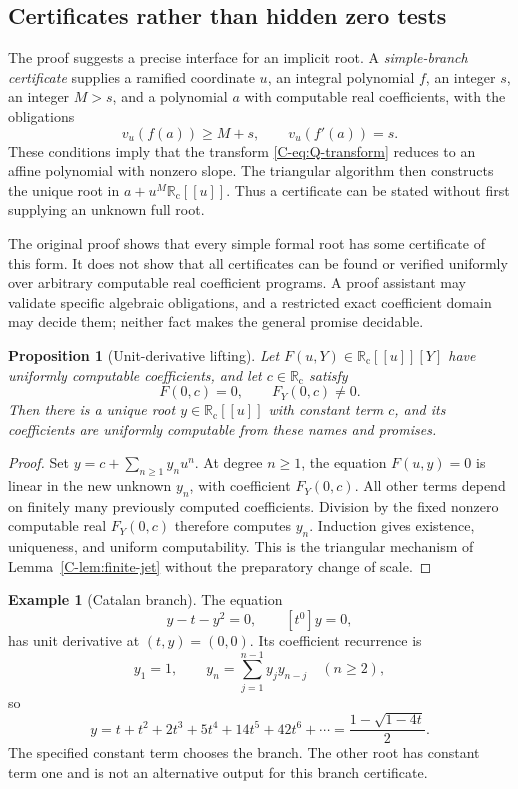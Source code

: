 \documentclass[11pt,letterpaper]{article}
\numberwithin{equation}{section}
\newtheorem{proposition}[theorem]{Proposition}
\theoremstyle{definition}
\newtheorem{example}[theorem]{Example}
\theoremstyle{remark}
\newcommand{\Rc}{\mathbb R_{\mathrm c}}
\begin{document}
\subsection{Certificates rather than hidden zero tests}

The proof suggests a precise interface for an implicit root. A
\emph{simple-branch certificate} supplies a ramified coordinate $u$, an
integral polynomial $f$, an integer $s$, an integer $M>s$, and a polynomial
$a$ with computable real coefficients, with the obligations
\begin{equation}
 v_u(f(a))\geq M+s,\qquad v_u(f'(a))=s.
 \label{C-eq:branch-cert}
\end{equation}
These conditions imply that the transform \eqref{C-eq:Q-transform} reduces
to an affine polynomial with nonzero slope. The triangular algorithm then
constructs the unique root in $a+u^M\Rc[[u]]$. Thus a certificate can be
stated without first supplying an unknown full root.

The original proof shows that every simple formal root has some certificate
of this form. It does not show that all certificates can be found or
verified uniformly over arbitrary computable real coefficient programs.
A proof assistant may validate specific algebraic obligations, and a
restricted exact coefficient domain may decide them; neither fact makes
the general promise decidable.

\begin{proposition}[Unit-derivative lifting]
\label{C-prop:unit-hensel}
Let $F(u,Y)\in\Rc[[u]][Y]$ have uniformly computable coefficients, and let
$c\in\Rc$ satisfy
\[
 F(0,c)=0,\qquad F_Y(0,c)\ne0.
\]
Then there is a unique root $y\in\Rc[[u]]$ with constant term $c$, and its
coefficients are uniformly computable from these names and promises.
\end{proposition}
\begin{proof}
Set $y=c+\sum_{n\geq1}y_nu^n$. At degree $n\geq1$, the equation $F(u,y)=0$
is linear in the new unknown $y_n$, with coefficient $F_Y(0,c)$.
All other terms depend on finitely many previously computed coefficients.
Division by the fixed nonzero computable real $F_Y(0,c)$ therefore computes
$y_n$. Induction gives existence, uniqueness, and uniform computability.
This is the triangular mechanism of Lemma~\ref{C-lem:finite-jet} without the
preparatory change of scale.
\end{proof}

\begin{example}[Catalan branch]
The equation
\[
 y-t-y^2=0,\qquad [t^0]y=0,
\]
has unit derivative at $(t,y)=(0,0)$. Its coefficient recurrence is
\[
 y_1=1,\qquad y_n=\sum_{j=1}^{n-1}y_jy_{n-j}\quad(n\geq2),
\]
so
\[
 y=t+t^2+2t^3+5t^4+14t^5+42t^6+\cdots
   =\frac{1-\sqrt{1-4t}}2.
\]
The specified constant term chooses the branch. The other root has constant
term one and is not an alternative output for this branch certificate.
\end{example}
\end{document}
